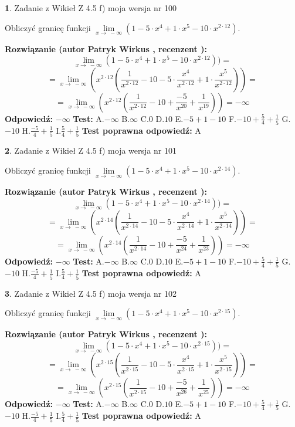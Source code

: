 \documentclass[12pt, a4paper]{article}
\theoremstyle{definition} %
\newtheorem{zad}{}
\newcommand{\zadStart}[1]{\begin{zad}#1\newline}
\newcommand{\zadStop}{\end{zad}}
\newcommand{\rozwStart}[2]{\noindent \textbf{Rozwiązanie (autor #1 , recenzent #2): }\newline}
\newcommand{\rozwStop}{\newline}
\newcommand{\odpStart}{\noindent \textbf{Odpowiedź:}\newline}
\newcommand{\odpStop}{\newline}
\newcommand{\testStart}{\noindent \textbf{Test:}\newline}
\newcommand{\testStop}{\newline}
\newcommand{\kluczStart}{\noindent \textbf{Test poprawna odpowiedź:}\newline}
\newcommand{\kluczStop}{\newline}
\begin{document}
\zadStart{Zadanie z Wikieł Z 4.5 f) moja wersja nr 100}



Obliczyć granicę funkcji  $\lim\limits_{x\to\ -\infty}(1 - 5 \cdot x^{4}+1 \cdot x^{5}- 10 \cdot x^{2\cdot12})$.
\zadStop
\rozwStart{Patryk Wirkus}{}
$$\lim\limits_{x\to\ -\infty}(1 - 5 \cdot x^{4}+1 \cdot x^{5}- 10 \cdot x^{2\cdot12}))=$$
$$=\lim\limits_{x\to\ -\infty}(x^{2\cdot12}(\frac{1}{x^{2\cdot12}}-10 -5 \cdot \frac{x^{4}}{x^{2\cdot12}}+1 \cdot \frac{x^{5}}{x^{2\cdot12}}))=$$
$$=\lim\limits_{x\to\ -\infty}(x^{2\cdot12}(\frac{1}{x^{2\cdot12}}-10 + \frac{-5}{x^{20}}+ \frac{1}{x^{19}}))=-\infty$$
\rozwStop
\odpStart
$-\infty$
\odpStop
\testStart
A.$-\infty$ B.$\infty$ C.$0$ D.$10$ E.$-5 + 1 - 10$
F.$-10+\frac{5}{4}+\frac{1}{5}$ G.$-10$
H.$\frac{-5}{4}+\frac{1}{5}$
I.$\frac{5}{4}+\frac{1}{5}$
\testStop
\kluczStart
A
\kluczStop



\zadStart{Zadanie z Wikieł Z 4.5 f) moja wersja nr 101}



Obliczyć granicę funkcji  $\lim\limits_{x\to\ -\infty}(1 - 5 \cdot x^{4}+1 \cdot x^{5}- 10 \cdot x^{2\cdot14})$.
\zadStop
\rozwStart{Patryk Wirkus}{}
$$\lim\limits_{x\to\ -\infty}(1 - 5 \cdot x^{4}+1 \cdot x^{5}- 10 \cdot x^{2\cdot14}))=$$
$$=\lim\limits_{x\to\ -\infty}(x^{2\cdot14}(\frac{1}{x^{2\cdot14}}-10 -5 \cdot \frac{x^{4}}{x^{2\cdot14}}+1 \cdot \frac{x^{5}}{x^{2\cdot14}}))=$$
$$=\lim\limits_{x\to\ -\infty}(x^{2\cdot14}(\frac{1}{x^{2\cdot14}}-10 + \frac{-5}{x^{24}}+ \frac{1}{x^{23}}))=-\infty$$
\rozwStop
\odpStart
$-\infty$
\odpStop
\testStart
A.$-\infty$ B.$\infty$ C.$0$ D.$10$ E.$-5 + 1 - 10$
F.$-10+\frac{5}{4}+\frac{1}{5}$ G.$-10$
H.$\frac{-5}{4}+\frac{1}{5}$
I.$\frac{5}{4}+\frac{1}{5}$
\testStop
\kluczStart
A
\kluczStop



\zadStart{Zadanie z Wikieł Z 4.5 f) moja wersja nr 102}



Obliczyć granicę funkcji  $\lim\limits_{x\to\ -\infty}(1 - 5 \cdot x^{4}+1 \cdot x^{5}- 10 \cdot x^{2\cdot15})$.
\zadStop
\rozwStart{Patryk Wirkus}{}
$$\lim\limits_{x\to\ -\infty}(1 - 5 \cdot x^{4}+1 \cdot x^{5}- 10 \cdot x^{2\cdot15}))=$$
$$=\lim\limits_{x\to\ -\infty}(x^{2\cdot15}(\frac{1}{x^{2\cdot15}}-10 -5 \cdot \frac{x^{4}}{x^{2\cdot15}}+1 \cdot \frac{x^{5}}{x^{2\cdot15}}))=$$
$$=\lim\limits_{x\to\ -\infty}(x^{2\cdot15}(\frac{1}{x^{2\cdot15}}-10 + \frac{-5}{x^{26}}+ \frac{1}{x^{25}}))=-\infty$$
\rozwStop
\odpStart
$-\infty$
\odpStop
\testStart
A.$-\infty$ B.$\infty$ C.$0$ D.$10$ E.$-5 + 1 - 10$
F.$-10+\frac{5}{4}+\frac{1}{5}$ G.$-10$
H.$\frac{-5}{4}+\frac{1}{5}$
I.$\frac{5}{4}+\frac{1}{5}$
\testStop
\kluczStart
A
\kluczStop
\end{document}
